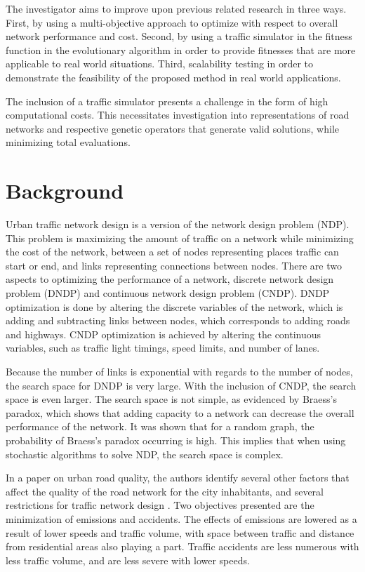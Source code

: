 \documentclass[11pt, oneside, notitlepage, final]{article}
\begin{document}
    The investigator aims to improve upon previous related research in three ways. First, by using a multi-objective approach to optimize with respect to overall network performance and cost. Second, by using a traffic simulator in the fitness function in the evolutionary algorithm in order to provide fitnesses that are more applicable to real world situations. Third, scalability testing in order to demonstrate the feasibility of the proposed method in real world applications.

    The inclusion of a traffic simulator presents a challenge in the form of high computational costs. This necessitates investigation into representations of road networks and respective genetic operators that generate valid solutions, while minimizing total evaluations.


\part{Background}
    Urban traffic network design is a version of the network design problem (NDP). This problem is maximizing the amount of traffic on a network while minimizing the cost of the network, between a set of nodes representing places traffic can start or end, and links representing connections between nodes. There are two aspects to optimizing the performance of a network, discrete network design problem (DNDP) and continuous network design problem (CNDP). DNDP optimization is done by altering the discrete variables of the network, which is adding and subtracting links between nodes, which corresponds to adding roads and highways. CNDP optimization is achieved by altering the continuous variables, such as traffic light timings, speed limits, and number of lanes.

    Because the number of links is exponential with regards to the number of nodes, the search space for DNDP is very large. With the inclusion of CNDP, the search space is even larger. The search space is not simple, as evidenced by Braess's paradox, which shows that adding capacity to a network can decrease the overall performance of the network. It was shown that for a random graph, the probability of Braess's paradox occurring is high\cite{6}. This implies that when using stochastic algorithms to solve NDP, the search space is complex.

    In a paper on urban road quality, the authors identify several other factors that affect the quality of the road network for the city inhabitants, and several restrictions for traffic network design \cite{5}. Two objectives presented are the minimization of emissions and accidents. The effects of emissions are lowered as a result of lower speeds and traffic volume, with space between traffic and distance from residential areas also playing a part. Traffic accidents are less numerous with less traffic volume, and are less severe with lower speeds.
\end{document}
